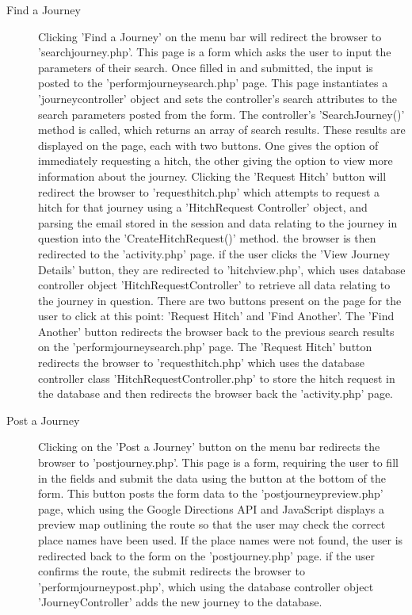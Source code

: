 \begin{description}
		\item[Find a Journey] Clicking 'Find a Journey' on the menu bar will redirect the browser to 'search\textunderscore journey.php'. This page is a form which asks the user to input the parameters of their search. Once filled in and submitted, the input is posted to the 'perform\textunderscore journey\textunderscore search.php' page. This page instantiates a 'journey\textunderscore controller' object and sets the controller's search attributes to the search parameters posted from the form. The controller's 'SearchJourney()' method is called, which returns an array of search results. These results are displayed on the page, each with two buttons. One gives the option of immediately requesting a hitch, the other giving the option to view more information about the journey. Clicking the 'Request Hitch' button will redirect the browser to 'request\textunderscore hitch.php' which attempts to request a hitch for that journey using a 'Hitch\textunderscore Request \textunderscore Controller' object, and parsing the email stored in the session and data relating to the journey in question into the 'CreateHitchRequest()' method. the browser is then redirected to the 'activity.php' page. if the user clicks the 'View Journey Details' button, they are redirected to 'hitch\textunderscore view.php', which uses database controller object 'Hitch\textunderscore Request\textunderscore Controller' to retrieve all data relating to the journey in question. There are two buttons present on the page for the user to click at this point: 'Request Hitch' and 'Find Another'. The 'Find Another' button redirects the browser back to the previous search results on the 'perform\textunderscore journey\textunderscore search.php' page. The 'Request Hitch' button redirects the browser to 'request\textunderscore hitch.php' which uses the database controller class 'Hitch\textunderscore Request\textunderscore Controller.php' to store the hitch request in the database and then redirects the browser back the 'activity.php' page.

		\item[Post a Journey] Clicking on the 'Post a Journey' button on the menu bar redirects the browser to 'post\textunderscore journey.php'. This page is a form, requiring the user to fill in the fields and submit the data using the button at the bottom of the form. This button posts the form data to the 'post\textunderscore journey\textunderscore preview.php' page, which using the Google Directions API \cite{google_directions_api} and JavaScript displays a preview map outlining the route so that the user may check the correct place names have been used. If the place names were not found, the user is redirected back to the form on the 'post\textunderscore journey.php' page. if the user confirms the route, the submit redirects the browser to 'perform\textunderscore journey\textunderscore post.php', which using the database controller object 'Journey\textunderscore Controller' adds the new journey to the database.
		\end{description}
		
